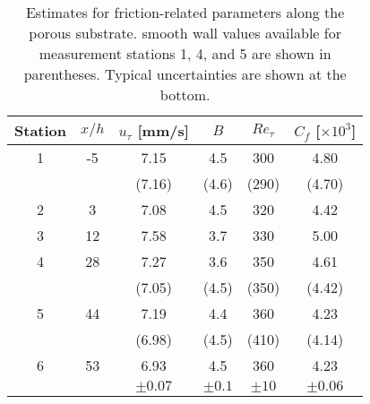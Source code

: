 \documentclass[letterpaper,11pt]{article}
\newcommand{\Ret}{Re_\tau}
\begin{document}
\begin{table}
	\centering
    \begin{tabular}{cccccc}
        \hline
        Station & $x/h$ & $u_\tau$ [mm/s] & $B$ & $\Ret$ & $C_f$ [$\times 10^3$] \\
        \hline
        1 & -5 &  7.15  &  4.5  &  300  &  4.80 \\
          &    & (7.16) & (4.6) & (290) & (4.70) \\
        2 & 3  &  7.08  &  4.5  &  320  &  4.42  \\
        3 & 12 &  7.58  &  3.7  &  330  &  5.00 \\
        4 & 28 &  7.27  &  3.6  &  350  &  4.61 \\
          &    & (7.05) & (4.5) & (350) & (4.42) \\
        5 & 44 &  7.19  &  4.4  &  360  &  4.23 \\
          &    & (6.98) & (4.5) & (410) & (4.14) \\
        6 & 53 &  6.93  &  4.5  &  360  &  4.23 \\        
        \hline
          &    & $\pm 0.07$ & $\pm 0.1$ & $\pm 10$ & $\pm 0.06$ \\ 
        \hline
    \end{tabular}
	\caption{Estimates for friction-related parameters along the porous substrate. smooth wall values available for measurement stations 1, 4, and 5 are shown in parentheses. Typical uncertainties are shown at the bottom.}
	\label{table:ut_table}
\end{table}
\end{document}
